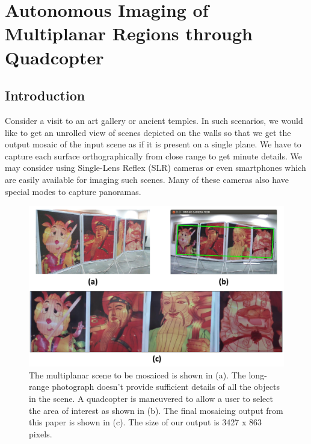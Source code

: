 \chapter[Multiplanar Imaging]{Autonomous Imaging of Multiplanar Regions through
Quadcopter}
\label{ch:multiplanar}
\section{Introduction}
Consider a visit to an art gallery or ancient temples. In such scenarios, we
would like to get an unrolled view of scenes depicted on the walls so that we
get the output mosaic of the input scene as if it is present on a single plane.
We have to capture each surface orthographically from close range to get minute
details. We may consider using Single-Lens Reflex (SLR) cameras or even
smartphones which are easily available for imaging such scenes. Many of these
cameras also have special modes to capture panoramas.
\begin{figure}[h!]
\centering
\includegraphics[width=0.98\linewidth]{figures/multiplanar/teaser2}
\caption[Overview of multiplanar imaging]{The multiplanar scene to be mosaiced is shown in (a). The long-range
photograph doesn't provide sufficient details of all the objects in the scene. A
quadcopter is maneuvered to allow a user to select the area of interest as shown
in (b). The final mosaicing output from this paper is shown in (c). The size of
our output is 3427 x 863 pixels.}
\label{fig:teaser}
\end{figure} 


